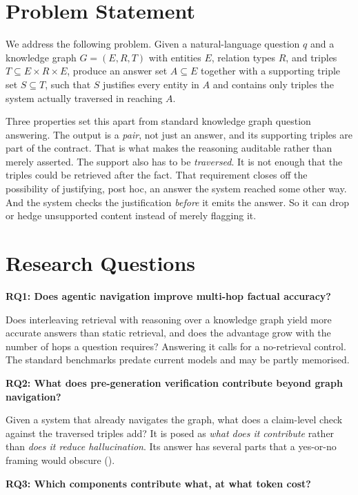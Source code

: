 \section{Problem Statement}\label{sec:problem}

We address the following problem. Given a natural-language question $q$ and a
knowledge graph $G = (E, R, T)$ with entities $E$, relation types $R$, and
triples $T \subseteq E \times R \times E$, produce an answer set $A \subseteq E$
together with a supporting triple set $S \subseteq T$, such that $S$ justifies
every entity in $A$ and contains only triples the system actually traversed in
reaching $A$.

Three properties set this apart from standard knowledge graph question
answering. The output is a \emph{pair}, not just an answer, and its supporting
triples are part of the contract. That is what makes the reasoning auditable
rather than merely asserted. The support also has to be \emph{traversed}. It is
not enough that the triples could be retrieved after the fact. That requirement
closes off the possibility of justifying, post hoc, an answer the system reached
some other way. And the system checks the justification \emph{before} it emits
the answer. So it can drop or hedge unsupported content instead of merely
flagging it.

\section{Research Questions}\label{sec:rqs}

\textbf{RQ1: Does agentic navigation improve multi-hop factual accuracy?}

Does interleaving retrieval with reasoning over a knowledge graph yield more
accurate answers than static retrieval, and does the advantage grow with the
number of hops a question requires? Answering it calls for a no-retrieval
control. The standard benchmarks predate current models and may be partly
memorised.

\textbf{RQ2: What does pre-generation verification contribute beyond graph
navigation?}

Given a system that already navigates the graph, what does a claim-level check
against the traversed triples add? It is posed as \emph{what does it contribute}
rather than \emph{does it reduce hallucination}. Its answer has several parts
that a yes-or-no framing would obscure ().

\textbf{RQ3: Which components contribute what, at what token cost?}

